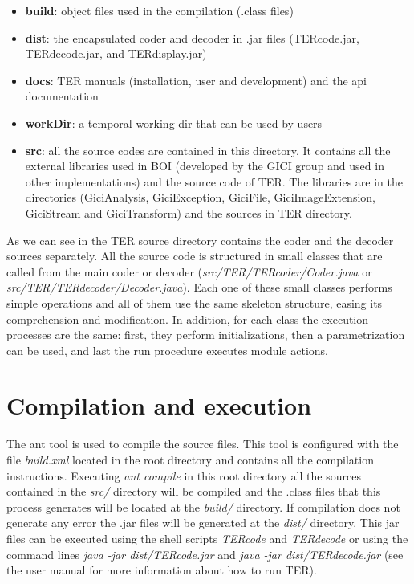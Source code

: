 \documentclass[a4paper,10pt]{article}
\begin{document}
	\begin{itemize}
		\item \textbf{build}: object files used in the compilation
		(.class files) 
		\item \textbf{dist}: the encapsulated coder and decoder in .jar
		files (TERcode.jar, TERdecode.jar, and TERdisplay.jar) 
		\item \textbf{docs}: TER manuals (installation, user and
		development) and the api documentation 
		\item \textbf{workDir}: a temporal working dir that can be used
		by users 
		\item \textbf{src}: all the source codes are contained in this
		directory. It contains all the external libraries used in BOI
		(developed by the GICI group and used in other implementations)
		and the source code of TER. The libraries are in the directories
		(GiciAnalysis, GiciException, GiciFile, GiciImageExtension,
		GiciStream and GiciTransform) and the sources in TER directory.  
	\end{itemize}

	As we can see in the TER source directory contains the
	coder and the decoder sources separately. All the source code is
	structured in small classes that are called from the main coder or
	decoder (\emph{src/TER/TERcoder/Coder.java} or
	\emph{src/TER/TERdecoder/Decoder.java}). Each one of these small
	classes performs simple operations and all of them use the same
	skeleton structure, easing its comprehension and modification. In
	addition, for each class the execution processes are the same:
	first, they perform initializations, then a parametrization can be
	used, and last the run procedure executes module actions.


\section{Compilation and execution}
\label{sect:compilation}

	The ant tool is used to compile the source files. This tool is
	configured with the file \emph{build.xml} located in the root
	directory and contains all the compilation instructions. Executing
	\emph{ant compile} in this root directory all the sources contained
	in the \emph{src/} directory will be compiled and the .class files
	that this process generates will be located at the \emph{build/}
	directory. If compilation does not generate any error the .jar
	files will be generated at the \emph{dist/} directory. This jar
	files can be executed using the shell scripts \emph{TERcode} and
	\emph{TERdecode} or using the command lines \emph{java -jar
	dist/TERcode.jar} and \emph{java -jar dist/TERdecode.jar} (see the
	user manual for more information about how to run TER). 
\end{document}
